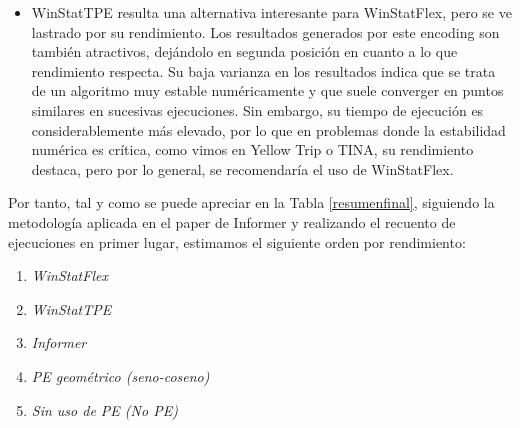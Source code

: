 \begin{itemize}
	 \item WinStatTPE resulta una alternativa interesante para WinStatFlex, pero se ve lastrado por su rendimiento. Los resultados generados por este encoding son también atractivos, dejándolo en segunda posición en cuanto a lo que rendimiento respecta. Su baja varianza en los resultados indica que se trata de un algoritmo muy estable numéricamente y que suele converger en puntos similares en sucesivas ejecuciones. Sin embargo, su tiempo de ejecución es considerablemente más elevado, por lo que en problemas donde la estabilidad numérica es crítica, como vimos en Yellow Trip o TINA, su rendimiento destaca, pero por lo general, se recomendaría el uso de WinStatFlex.
\end{itemize}

Por tanto, tal y como se puede apreciar en la Tabla \ref{resumenfinal}, siguiendo la metodología aplicada en el paper de Informer\cite{zhou2021informerefficienttransformerlong} y realizando el recuento de ejecuciones en primer lugar, estimamos el siguiente orden por rendimiento:

\begin{enumerate}
	\item \textit{WinStatFlex}
	\item \textit{WinStatTPE}
	\item \textit{Informer}
	\item \textit{PE geométrico (seno-coseno)}
	\item \textit{Sin uso de PE (No PE)}
\end{enumerate}

